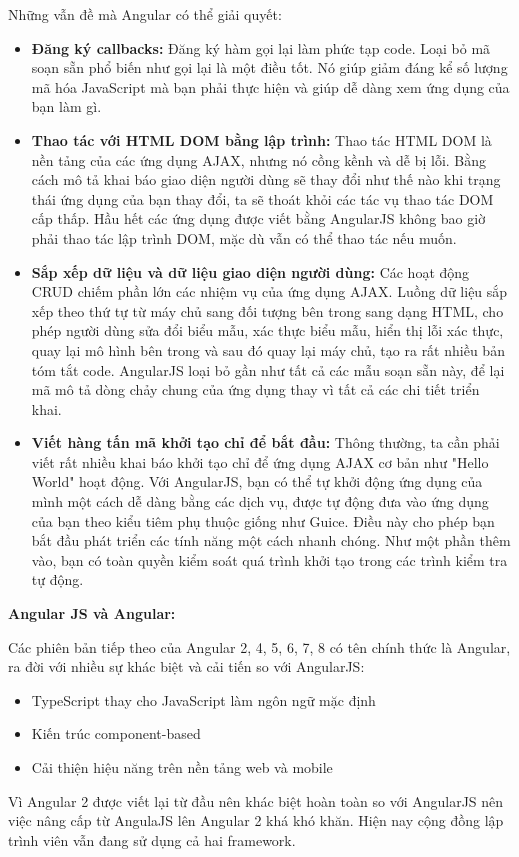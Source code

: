 Những vẫn đề mà Angular có thể giải quyết:
\begin{itemize}
    \item \textbf{Đăng ký callbacks:} Đăng ký hàm gọi lại làm phức tạp code. Loại bỏ mã soạn sẵn phổ biến như gọi lại là một điều tốt. Nó giúp giảm đáng kể số lượng mã hóa JavaScript mà bạn phải thực hiện và giúp dễ dàng xem ứng dụng của bạn làm gì.
    \item \textbf{Thao tác với HTML DOM bằng lập trình:} Thao tác HTML DOM là nền tảng của các ứng dụng AJAX, nhưng nó cồng kềnh và dễ bị lỗi. Bằng cách mô tả khai báo giao diện người dùng sẽ thay đổi như thế nào khi trạng thái ứng dụng của bạn thay đổi, ta sẽ thoát khỏi các tác vụ thao tác DOM cấp thấp. Hầu hết các ứng dụng được viết bằng AngularJS không bao giờ phải thao tác lập trình DOM, mặc dù vẫn có thể thao tác nếu muốn.
    \item \textbf{Sắp xếp dữ liệu và dữ liệu giao diện người dùng:} Các hoạt động CRUD chiếm phần lớn các nhiệm vụ của ứng dụng AJAX. Luồng dữ liệu sắp xếp theo thứ tự từ máy chủ sang đối tượng bên trong sang dạng HTML, cho phép người dùng sửa đổi biểu mẫu, xác thực biểu mẫu, hiển thị lỗi xác thực, quay lại mô hình bên trong và sau đó quay lại máy chủ, tạo ra rất nhiều bản tóm tắt code. AngularJS loại bỏ gần như tất cả các mẫu soạn sẵn này, để lại mã mô tả dòng chảy chung của ứng dụng thay vì tất cả các chi tiết triển khai.
    \item \textbf{Viết hàng tấn mã khởi tạo chỉ để bắt đầu:} Thông thường, ta cần phải viết rất nhiều khai báo khởi tạo chỉ để ứng dụng AJAX cơ bản như "Hello World" hoạt động. Với AngularJS, bạn có thể tự khởi động ứng dụng của mình một cách dễ dàng bằng các dịch vụ, được tự động đưa vào ứng dụng của bạn theo kiểu tiêm phụ thuộc giống như Guice. Điều này cho phép bạn bắt đầu phát triển các tính năng một cách nhanh chóng. Như một phần thêm vào, bạn có toàn quyền kiểm soát quá trình khởi tạo trong các trình kiểm tra tự động.
\end{itemize}

\textbf{Angular JS và Angular:}

Các phiên bản tiếp theo của Angular 2, 4, 5, 6, 7, 8 có tên chính thức là Angular, ra đời với nhiều sự khác biệt và cải tiến so với AngularJS:
\begin {itemize}
\item TypeScript thay cho JavaScript làm ngôn ngữ mặc định
\item Kiến trúc component-based
\item Cải thiện hiệu năng trên nền tảng web và mobile
\end {itemize}
Vì Angular 2 được viết lại từ đầu nên khác biệt hoàn toàn so với AngularJS nên việc nâng cấp từ AngulaJS lên Angular 2 khá khó khăn. Hiện nay cộng đồng lập trình viên vẫn đang sử dụng cả hai framework.

